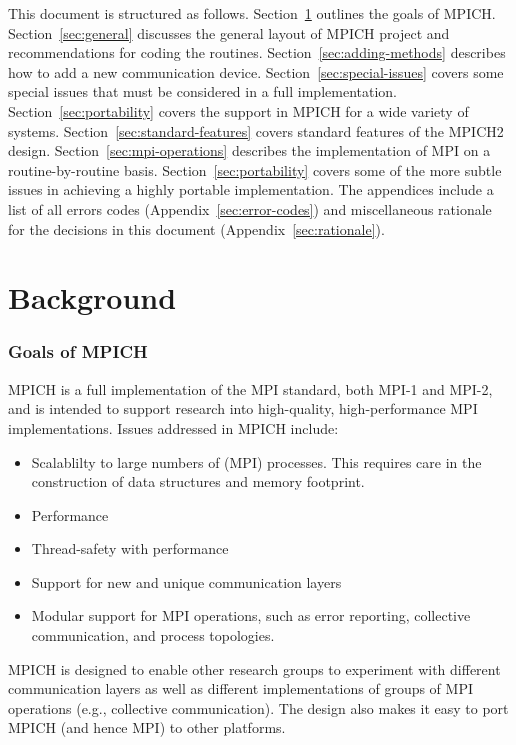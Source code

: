 \documentclass{article}
\begin{document}
This document is structured as follows.  Section~\ref{sec:goals}
outlines the goals of MPICH.  Section~\ref{sec:general} discusses
the general layout of MPICH project and recommendations for coding the
routines.  
Section~\ref{sec:adding-methods} describes how to add a new
communication device.  Section~\ref{sec:special-issues} covers some
special issues that must be considered in a full implementation.
Section~\ref{sec:portability} covers the support in MPICH for a wide
variety of systems.  Section~\ref{sec:standard-features} covers
standard features of the MPICH2 design. 
Section~\ref{sec:mpi-operations} describes the implementation of
MPI on a routine-by-routine basis.  Section~\ref{sec:portability} covers some
of the more subtle issues in achieving a highly portable implementation.
The appendices
include a list of all errors codes (Appendix~\ref{sec:error-codes}) and
miscellaneous rationale for the decisions in this document
(Appendix~\ref{sec:rationale}). 

\part{Background}
\section{Goals of MPICH}
\label{sec:goals}

MPICH is a full implementation of the MPI standard, both MPI-1 and
MPI-2, and is intended to support research into high-quality,
high-performance MPI 
implementations.  Issues addressed in MPICH include:
\begin{itemize}
\item Scalablilty to large numbers of (MPI) processes.  This requires
  care in the construction of data structures and memory footprint.
\item Performance
\item Thread-safety with performance
\item Support for new and unique communication layers
\item Modular support for MPI operations, such as error reporting,
 collective communication, and process topologies.
\end{itemize}
MPICH is designed to enable other research groups to experiment with
different communication layers as well as different implementations of
groups of MPI operations (e.g., collective communication).  The design
also makes it easy to port MPICH (and hence MPI) to other platforms.
\end{document}
